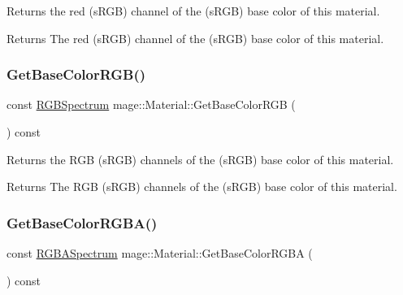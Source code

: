 Returns the red (s\+R\+GB) channel of the (s\+R\+GB) base color of this material.

\begin{DoxyReturn}{Returns}
The red (s\+R\+GB) channel of the (s\+R\+GB) base color of this material. 
\end{DoxyReturn}
\hypertarget{structmage_1_1_material_ab1922190e8759c458ade0dfac0da5805}{}\label{structmage_1_1_material_ab1922190e8759c458ade0dfac0da5805} 
\subsubsection{\texorpdfstring{Get\+Base\+Color\+R\+G\+B()}{GetBaseColorRGB()}}
{\footnotesize\ttfamily const \hyperlink{structmage_1_1_r_g_b_spectrum}{R\+G\+B\+Spectrum} mage\+::\+Material\+::\+Get\+Base\+Color\+R\+GB (\begin{DoxyParamCaption}{ }\end{DoxyParamCaption}) const\hspace{0.3cm}{\ttfamily [noexcept]}}

Returns the R\+GB (s\+R\+GB) channels of the (s\+R\+GB) base color of this material.

\begin{DoxyReturn}{Returns}
The R\+GB (s\+R\+GB) channels of the (s\+R\+GB) base color of this material. 
\end{DoxyReturn}
\hypertarget{structmage_1_1_material_ac79470bc12929841786bcc41fdd209d9}{}\label{structmage_1_1_material_ac79470bc12929841786bcc41fdd209d9} 
\subsubsection{\texorpdfstring{Get\+Base\+Color\+R\+G\+B\+A()}{GetBaseColorRGBA()}}
{\footnotesize\ttfamily const \hyperlink{structmage_1_1_r_g_b_a_spectrum}{R\+G\+B\+A\+Spectrum} mage\+::\+Material\+::\+Get\+Base\+Color\+R\+G\+BA (\begin{DoxyParamCaption}{ }\end{DoxyParamCaption}) const\hspace{0.3cm}{\ttfamily [noexcept]}}

